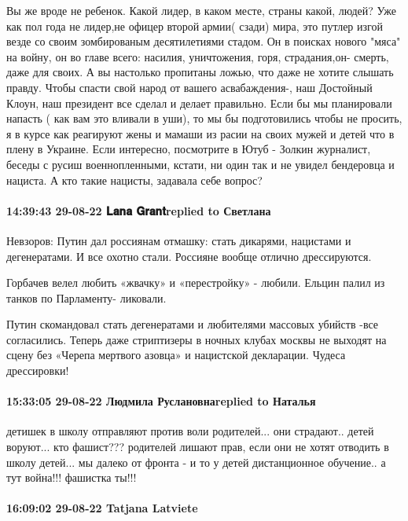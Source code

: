 Вы же вроде не ребенок. Какой лидер, в каком месте, страны какой, людей?
Уже как пол года не лидер,не офицер второй🤣армии( сзади) мира, это путлер изгой везде со своим зомбированым десятилетиями стадом. Он в поисках нового "мяса" на войну, он во главе всего: насилия, уничтожения, горя, страдания,он- смерть, даже для своих. А вы настолько пропитаны ложью, что даже не хотите слышать правду.
Чтобы спасти свой народ от вашего асвабаждения-, наш Достойный Клоун, наш президент все сделал и делает правильно. Если бы мы планировали напасть ( как вам это вливали в уши), то мы бы подготовились чтобы не просить, я в курсе как реагируют жены и мамаши из расии на своих мужей и детей что в плену в Украине. Если интересно, посмотрите в Ютуб - Золкин журналист, беседы с русиш военнопленными, кстати, ни один так и не увидел бендеровца и нациста. А кто такие нацисты, задавала себе вопрос?

\paragraph{14:39:43 29-08-22 𝐋𝐚𝐧𝐚 𝐆𝐫𝐚𝐧𝐭replied to Светлана}

Невзоров: Путин дал россиянам отмашку: стать дикарями, нацистами и
дегенератами. И все охотно стали. Россияне вообще отлично дрессируются.

Горбачев велел любить «жвачку» и «перестройку» - любили.
Ельцин палил из танков по Парламенту- ликовали.

Путин скомандовал стать дегенератами и любителями массовых убийств -все
согласились. Теперь даже стриптизеры в ночных клубах москвы не выходят на сцену
без «Черепа мертвого азовца» и нацистской декларации. Чудеса дрессировки!

\paragraph{15:33:05 29-08-22 Людмила Руслановнаreplied to Наталья}

детишек в школу отправляют против воли родителей... они страдают.. детей
воруют... кто фашист??? родителей лишают прав, если они не хотят отводить в
школу детей... мы далеко от фронта - и то у детей дистанционное обучение.. а
тут война!!! фашистка ты!!!

\paragraph{16:09:02 29-08-22 Tatjana Latviete}

